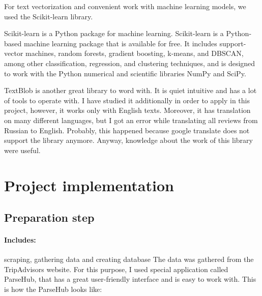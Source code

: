 \documentclass{article}
\begin{document}
For text vectorization and convenient work with machine learning models, we used the Scikit-learn library.

Scikit-learn is a Python package for machine learning. Scikit-learn is a Python-based machine learning package that is available for free. It includes support-vector machines, random forests, gradient boosting, k-means, and DBSCAN, among other classification, regression, and clustering techniques, and is designed to work with the Python numerical and scientific libraries NumPy and SciPy.\cite{srinivasa2018natural}

TextBlob is another great library to word with. It is quiet intuitive and has a lot of tools to operate with. I have studied it additionally in order to apply in this project, however, it works only with English texts. Moreover, it has translation on many different languages, but I got an error while translating all reviews from Russian to English. Probably, this happened because google translate does not support the library anymore. Anyway, knowledge about the work of this library were useful.\cite{gujjar2021sentiment}

\newpage
\section{Project implementation}
\subsection{Preparation step}
\setcounter{section}{9}
\paragraph{Includes:} scraping, gathering data and creating database \newline\newline
The data was gathered from the TripAdvisors website. For this purpose, I used special application called ParseHub, that has a great user-friendly interface and is easy to work with. \newline\newline
This is how the ParseHub looks like: 
\end{document}
